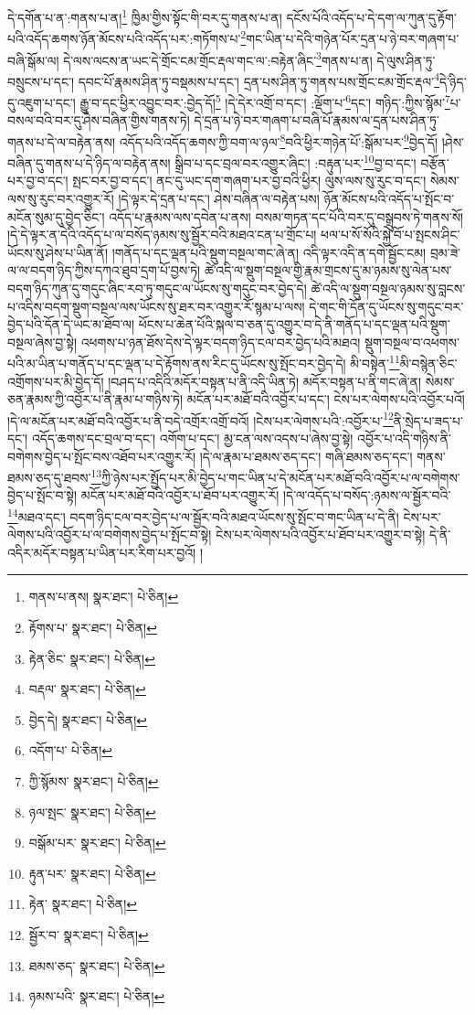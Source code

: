 དེ་དགོན་པ་ན་:གནས་པ་ན།\footnote{གནས་པ་ནས།  སྣར་ཐང་།  པེ་ཅིན། } ཁྱིམ་གྱིས་སྟོང་གི་བར་དུ་གནས་པ་ན། དངོས་པོའི་འདོད་པ་དེ་དག་ལ་ཀུན་དུ་རྟོག་པའི་འདོད་ཆགས་ཉོན་མོངས་པའི་འདོད་པར་:གཏོགས་པ་\footnote{རྟོགས་པ་  སྣར་ཐང་།  པེ་ཅིན། }གང་ཡིན་པ་དེའི་གཉེན་པོར་དྲན་པ་ཉེ་བར་གཞག་པ་བཞི་སྒོམ་ལ། དེ་ལས་ལངས་ན་ཡང་དེ་གྲོང་ངམ་གྲོང་རྡལ་གང་ལ་:བརྟེན་ཞིང་\footnote{རྟེན་ཅིང་  སྣར་ཐང་།  པེ་ཅིན། }གནས་པ་ན། དེ་ལུས་ཤིན་ཏུ་བསྲུངས་པ་དང་། དབང་པོ་རྣམས་ཤིན་ཏུ་བསྡམས་པ་དང་། དྲན་པས་ཤིན་ཏུ་གནས་པས་གྲོང་ངམ་གྲོང་རྡལ་\footnote{བརྡལ་  སྣར་ཐང་།  པེ་ཅིན། }དེ་ཉིད་དུ་འཇུག་པ་དང་། རྒྱུ་བ་དང་ཕྱིར་འབྱུང་བར་:བྱེད་དོ།\footnote{བྱེད་དེ།  སྣར་ཐང་།  པེ་ཅིན། } །དེ་དེར་འགྲོ་བ་དང་། :ལྡོག་པ་\footnote{འདོག་པ་  པེ་ཅིན། }དང་། གཉིད་:ཀྱིས་སྙོམ་\footnote{ཀྱི་སྙོམས་  སྣར་ཐང་།  པེ་ཅིན། }པ་བསལ་བའི་བར་དུ་ཤེས་བཞིན་གྱིས་གནས་ཏེ། དེ་དྲན་པ་ཉེ་བར་གཞག་པ་བཞི་པོ་རྣམས་ལ་དྲན་པས་ཤིན་ཏུ་གནས་པ་དེ་ལ་བརྟེན་ནས། འདོད་པའི་འདོད་ཆགས་ཀྱི་བག་ལ་ཉལ་\footnote{ཉལ་སྤང་  སྣར་ཐང་།  པེ་ཅིན། }བའི་ཕྱིར་གཉེན་པོ་:སྒོམ་པར་\footnote{བསྒོམ་པར་  སྣར་ཐང་།  པེ་ཅིན། }བྱེད་དོ། །ཤེས་བཞིན་དུ་གནས་པ་དེ་ཉིད་ལ་བརྟེན་ནས། སྒྲིབ་པ་དང་བྲལ་བར་འགྱུར་ཞིང་། :བརྟུན་པར་\footnote{རྟུན་པར་  སྣར་ཐང་།  པེ་ཅིན། }བྱ་བ་དང་། བརྩོན་པར་བྱ་བ་དང་། སྤང་བར་བྱ་བ་དང་། ནང་དུ་ཡང་དག་གཞག་པར་བྱ་བའི་ཕྱིར། ལུས་ལས་སུ་རུང་བ་དང་། སེམས་ལས་སུ་རུང་བར་འགྱུར་རོ། །དེ་ལྟར་དེ་དྲན་པ་དང་། ཤེས་བཞིན་ལ་བརྟེན་པས། ཉོན་མོངས་པའི་འདོད་པ་སྤོང་བ་མངོན་སུམ་དུ་བྱེད་ཅིང་། འདོད་པ་རྣམས་ལས་དབེན་པ་ནས། བསམ་གཏན་དང་པོའི་བར་དུ་བསྒྲུབས་ཏེ་གནས་སོ། །དེ་དེ་ལྟར་ན་དེའི་འདོད་པ་ལ་བསོད་ཉམས་སུ་སྦྱོར་བའི་མཐའ་ངན་པ་གྲོང་པ། ཕལ་པ་སོ་སོའི་སྐྱེ་བོ་པ་སྤངས་ཤིང་ཡོངས་སུ་ཤེས་པ་ཡིན་ནོ། །གནོད་པ་དང་ལྡན་པའི་སྡུག་བསྔལ་གང་ཞེ་ན། འདི་ལྟར་འདི་ན་དགེ་སྦྱོང་ངམ། བྲམ་ཟེ་ལ་ལ་བདག་ཉིད་ཀྱིས་དཀའ་ཐུབ་དྲག་པོ་བྱས་ཏེ། ཚེ་འདི་ལ་སྡུག་བསྔལ་གྱི་རྣམ་གྲངས་དུ་མ་ཉམས་སུ་ལེན་པས་བདག་ཉིད་ཀུན་དུ་གདུང་ཞིང་རབ་ཏུ་གདུང་ལ་ཡོངས་སུ་གདུང་བར་བྱེད་དེ། ཚེ་འདི་ལ་སྡུག་བསྔལ་ཉམས་སུ་བླངས་པ་འདིས་བདག་སྡུག་བསྔལ་ལས་ཡོངས་སུ་ཐར་བར་འགྱུར་རོ་སྙམ་པ་ལས། དེ་གང་གི་དོན་དུ་ཡོངས་སུ་གདུང་བར་བྱེད་པའི་དོན་དེ་ཡང་མ་ཐོབ་ལ། ཕོངས་པ་ཆེན་པོའི་སྐལ་བ་ཅན་དུ་འགྱུར་བ་དེ་ནི་གནོད་པ་དང་ལྡན་པའི་སྡུག་བསྔལ་ཞེས་བྱ་སྟེ། འཕགས་པ་ཉན་ཐོས་དེས་དེ་ལྟར་བདག་ཉིད་ངལ་བར་བྱེད་པའི་མཐའ། སྡུག་བསྔལ་བ་འཕགས་པའི་མ་ཡིན་པ་གནོད་པ་དང་ལྡན་པ་དེ་རྟོགས་ནས་རིང་དུ་ཡོངས་སུ་སྤོང་བར་བྱེད་དེ། མི་བསྟེན་\footnote{རྟེན་  སྣར་ཐང་།  པེ་ཅིན། }མི་བསྙེན་ཅིང་འགྲོགས་པར་མི་བྱེད་དོ། །བཤད་པ་འདིའི་མདོར་བསྟན་པ་ནི་འདི་ཡིན་ཏེ། མདོར་བསྟན་པ་ནི་གང་ཞེ་ན། སེམས་ཅན་རྣམས་ཀྱི་འབྱོར་པ་ནི་རྣམ་པ་གཉིས་ཏེ། མངོན་པར་མཐོ་བའི་འབྱོར་པ་དང་། ངེས་པར་ལེགས་པའི་འབྱོར་པའོ། །དེ་ལ་མངོན་པར་མཐོ་བའི་འབྱོར་པ་ནི་བདེ་འགྲོར་འགྲོ་བའོ། །ངེས་པར་ལེགས་པའི་:འབྱོར་པ་\footnote{སྦྱོར་བ་  སྣར་ཐང་།  པེ་ཅིན། }ནི་སྲེད་པ་ཟད་པ་དང་། འདོད་ཆགས་དང་བྲལ་བ་དང་། འགོག་པ་དང་། མྱ་ངན་ལས་འདས་པ་ཞེས་བྱ་སྟེ། འབྱོར་པ་འདི་གཉིས་ནི་བགེགས་བྱེད་པ་སྤོང་བས་འཐོབ་པར་འགྱུར་རོ། །དེ་ལ་རྣམ་པ་ཐམས་ཅད་དང་། གཞི་ཐམས་ཅད་དང་། གནས་ཐམས་ཅད་དུ་ཐབས་\footnote{ཐམས་ཅད་  སྣར་ཐང་།  པེ་ཅིན། }ཀྱི་ཉེས་པར་སྤྱོད་པར་མི་བྱེད་པ་གང་ཡིན་པ་དེ་མངོན་པར་མཐོ་བའི་འབྱོར་པ་ལ་བགེགས་བྱེད་པ་སྤོང་བ་སྟེ། མངོན་པར་མཐོ་བའི་འབྱོར་པ་ཐོབ་པར་འགྱུར་རོ། །དེ་ལ་འདོད་པ་བསོད་:ཉམས་ལ་སྦྱོར་བའི་\footnote{ཉམས་པའི་  སྣར་ཐང་།  པེ་ཅིན། }མཐའ་དང་། བདག་ཉིད་ངལ་བར་བྱེད་པ་ལ་སྦྱོར་བའི་མཐའ་ཡོངས་སུ་སྤོང་བ་གང་ཡིན་པ་དེ་ནི། ངེས་པར་ལེགས་པའི་འབྱོར་པ་ལ་བགེགས་བྱེད་པ་སྤོང་བ་སྟེ། ངེས་པར་ལེགས་པའི་འབྱོར་པ་ཐོབ་པར་འགྱུར་བ་སྟེ། དེ་ནི་འདིར་མདོར་བསྟན་པ་ཡིན་པར་རིག་པར་བྱའོ། །
